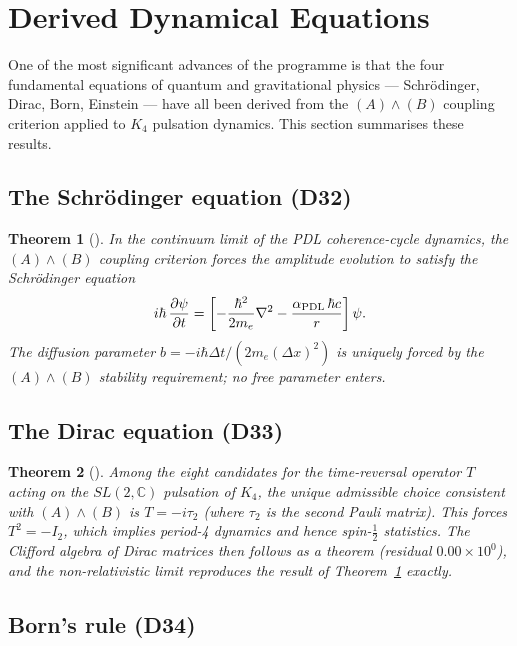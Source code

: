 \documentclass[11pt,a4paper]{article}
\theoremstyle{plain}
\newtheorem{theorem}{Theorem}[section]
\theoremstyle{definition}
\theoremstyle{remark}
\newcommand{\PDL}{\textnormal{PDL}}
\newcommand{\Kfour}{K_4}
\begin{document}
\section{Derived Dynamical Equations}
\label{sec:dynamics}

One of the most significant advances of the programme is that the four fundamental equations of quantum and gravitational physics — Schr\"odinger, Dirac, Born, Einstein — have all been derived from the $(A)\wedge(B)$ coupling criterion applied to $\Kfour$ pulsation dynamics.
This section summarises these results.

\subsection{The Schr\"odinger equation (D32)}
\label{subsec:schrodinger}

\begin{theorem}[\citep{D32}]
\label{thm:Schrodinger}
In the continuum limit of the PDL coherence-cycle dynamics, the $(A)\wedge(B)$ coupling criterion forces the amplitude evolution to satisfy the Schr\"odinger equation
\[
i\hbar\,\frac{\partial\psi}{\partial t} = \left[-\frac{\hbar^2}{2m_e}\nabla^2 - \frac{\alpha_{\PDL}\,\hbar c}{r}\right]\psi.
\]
The diffusion parameter $b=-i\hbar\Delta t/(2m_e(\Delta x)^2)$ is uniquely forced by the $(A)\wedge(B)$ stability requirement; no free parameter enters.
\end{theorem}

\subsection{The Dirac equation (D33)}
\label{subsec:dirac}

\begin{theorem}[\citep{D33}]
\label{thm:Dirac}
Among the eight candidates for the time-reversal operator $T$ acting on the $SL(2,\mathbb{C})$ pulsation of $\Kfour$, the unique admissible choice consistent with $(A)\wedge(B)$ is $T=-i\tau_2$ (where $\tau_2$ is the second Pauli matrix).
This forces $T^2=-I_2$, which implies period-4 dynamics and hence spin-$\tfrac{1}{2}$ statistics.
The Clifford algebra of Dirac matrices then follows as a theorem (residual $0.00\times10^0$), and the non-relativistic limit reproduces the result of Theorem~\ref{thm:Schrodinger} exactly.
\end{theorem}

\subsection{Born's rule (D34)}
\label{subsec:born}
\end{document}

